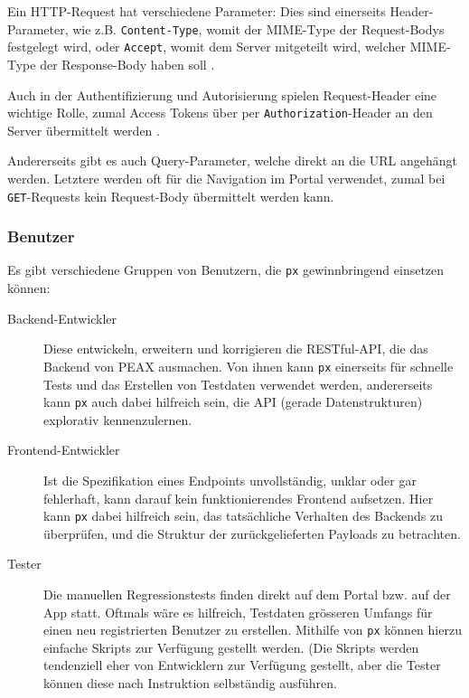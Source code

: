 Ein HTTP-Request hat verschiedene Parameter: Dies sind einerseits Header-Parameter, wie z.B. \texttt{Content-Type}, womit der MIME-Type der Request-Bodys festgelegt wird, oder \texttt{Accept}, womit dem Server mitgeteilt wird, welcher MIME-Type der Response-Body haben soll \cite{RFC2616}.

Auch in der Authentifizierung und Autorisierung spielen Request-Header eine wichtige Rolle, zumal Access Tokens über per \texttt{Authorization}-Header an den Server übermittelt werden \cite[Kapitel 7.1]{RFC6794}.

Andererseits gibt es auch Query-Parameter, welche direkt an die URL angehängt werden. Letztere werden oft für die Navigation im Portal verwendet, zumal bei \texttt{GET}-Requests kein Request-Body übermittelt werden kann.

\subsubsection{Benutzer}
\label{sec:Benutzer}

Es gibt verschiedene Gruppen von Benutzern, die \texttt{px} gewinnbringend einsetzen können:

\begin{description}
    \item[Backend-Entwickler] Diese entwickeln, erweitern und korrigieren die RESTful-API, die das Backend von PEAX ausmachen. Von ihnen kann \texttt{px} einerseits für schnelle Tests und das Erstellen von Testdaten verwendet werden, andererseits kann \texttt{px} auch dabei hilfreich sein, die API (gerade Datenstrukturen) explorativ kennenzulernen.
    \item[Frontend-Entwickler] Ist die Spezifikation eines Endpoints unvollständig, unklar oder gar fehlerhaft, kann darauf kein funktionierendes Frontend aufsetzen. Hier kann \texttt{px} dabei hilfreich sein, das tatsächliche Verhalten des Backends zu überprüfen, und die Struktur der zurückgelieferten Payloads zu betrachten.
    \item[Tester] Die manuellen Regressionstests finden direkt auf dem Portal bzw. auf der App statt. Oftmals wäre es hilfreich, Testdaten grösseren Umfangs für einen neu registrierten Benutzer zu erstellen. Mithilfe von \texttt{px} können hierzu einfache Skripts zur Verfügung gestellt werden. (Die Skripts werden tendenziell eher von Entwicklern zur Verfügung gestellt, aber die Tester können diese nach Instruktion selbständig ausführen.
\end{description}

